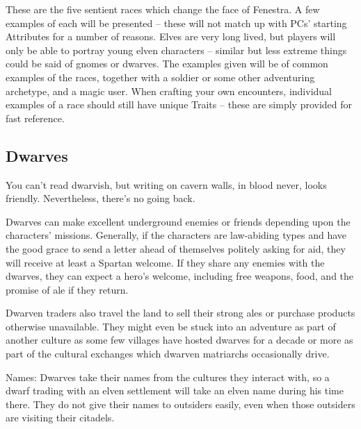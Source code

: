 \begin{multicols}{2}

\noindent
These are the five sentient races which change the face of Fenestra.
A few examples of each will be presented -- these will not match up with PCs' starting Attributes for a number of reasons.
Elves are very long lived, but players will only be able to portray young elven characters -- similar but less extreme things could be said of gnomes or dwarves.
The examples given will be of common examples of the races, together with a soldier or some other adventuring archetype, and a magic user.
When crafting your own encounters, individual examples of a race should still have unique Traits -- these are simply provided for fast reference.

\subsection{Dwarves}

\begin{boxtext}

	You can't read dwarvish, but writing on cavern walls, in blood never, looks friendly.
	Nevertheless, there's no going back.

\end{boxtext}

Dwarves can make excellent underground enemies or friends depending upon the characters' missions.
Generally, if the characters are law-abiding types and have the good grace to send a letter ahead of themselves politely asking for aid, they will receive at least a Spartan welcome.
If they share any enemies with the dwarves, they can expect a hero's welcome, including free weapons, food, and the promise of ale if they return.

Dwarven traders also travel the land to sell their strong ales or purchase products otherwise unavailable.
They might even be stuck into an adventure as part of another culture as some few villages have hosted dwarves for a decade or more as part of the cultural exchanges which dwarven matriarchs occasionally drive.

Names: Dwarves take their names from the cultures they interact with, so a dwarf trading with an elven settlement will take an elven name during his time there.
They do not give their names to outsiders easily, even when those outsiders are visiting their citadels.

\begin{boxtext}


\end{boxtext}
\end{multicols}
